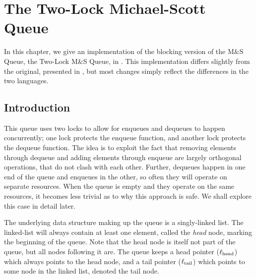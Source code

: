 \documentclass[a4paper, 10pt]{report}
\theoremstyle{definition}
\newcommand{\msq}{M\&S Queue}
\newcommand{\tlmsq}{Two-Lock \msq{}}
\newcommand{\locN}[1]{\loc_{\mathrm{#1}}}
\newcommand{\lochead}{\locN{head}}
\newcommand{\loctail}{\locN{tail}}
\begin{document}

\chapter{The Two-Lock Michael-Scott Queue}
\label{ch:TLMSQ}

In this chapter, we give an implementation of the blocking version of the \msq{}, the \tlmsq{}, in \heaplang. This implementation differs slightly from the original, presented in \citet{DBLP:conf/podc/MichaelS96}, but most changes simply reflect the differences in the two languages.

\section{Introduction}
\label{TLMSQ:section:introduction}

This queue uses two locks to allow for enqueues and dequeues to happen concurrently; one lock protects the enqueue function, and another lock protects the dequeue function. The idea is to exploit the fact that removing elements through dequeue and adding elements through enqueue are largely orthogonal operations, that do not clash with each other. Further, dequeues happen in one end of the queue and enqueues in the other, so often they will operate on separate resources. When the queue is empty and they operate on the same resources, it becomes less trivial as to why this approach is safe. We shall explore this case in detail later.

The underlying data structure making up the queue is a singly-linked list. The linked-list will always contain at least one element, called the \emph{head} node, marking the beginning of the queue. Note that the head node is itself not part of the queue, but all nodes following it are. The queue keeps a head pointer ($\lochead$) which always points to the head node, and a tail pointer ($\loctail$) which points to some node in the linked list, denoted the tail node.
\end{document}
